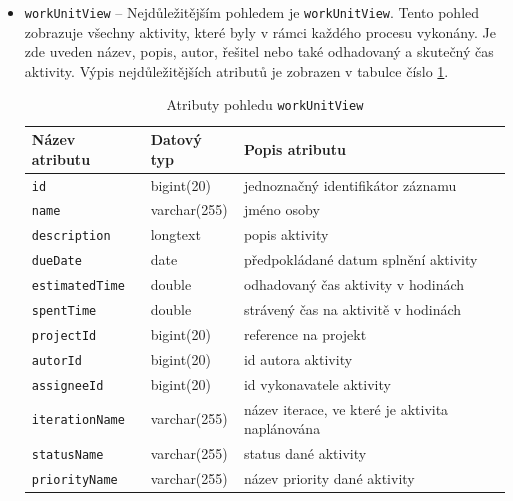 \documentclass[czech,DP]{thesiskiv}
\begin{document}
\begin{itemize}
    \item \texttt{workUnitView} -- Nejdůležitějším pohledem je \texttt{workUnitView}. Tento pohled zobrazuje všechny aktivity, které byly v rámci každého procesu vykonány. Je zde uveden název, popis, autor, řešitel nebo také odhadovaný a skutečný čas aktivity. Výpis nejdůležitějších atributů je zobrazen v tabulce číslo \ref{tab:workunitview}.
    \begin{table}[]
        \begin{tabular}{|l|l|l|}
        \hline
        \textbf{Název atributu} & \textbf{Datový typ} & \textbf{Popis atributu}                         \\ \hline \hline
        \texttt{id}             & bigint(20)          & jednoznačný identifikátor záznamu               \\ \hline
        \texttt{name}           & varchar(255)        & jméno osoby                                     \\ \hline
        \texttt{description}    & longtext        & popis aktivity                                  \\ \hline
        \texttt{dueDate}        & date                & předpokládané datum splnění aktivity            \\ \hline
        \texttt{estimatedTime}  & double              & odhadovaný čas aktivity v hodinách              \\ \hline
        \texttt{spentTime}      & double              & strávený čas na aktivitě v hodinách             \\ \hline
        \texttt{projectId}      & bigint(20)          & reference na projekt                            \\ \hline
        \texttt{autorId}        & bigint(20)         & id autora aktivity                              \\ \hline
        \texttt{assigneeId}     & bigint(20)         & id vykonavatele aktivity                        \\ \hline
        \texttt{iterationName}  & varchar(255)        & název iterace, ve které je aktivita naplánována \\ \hline
        \texttt{statusName}     & varchar(255)        & status dané aktivity                            \\ \hline
        \texttt{priorityName}   & varchar(255)        & název priority dané aktivity                    \\ \hline
        \end{tabular}
        \caption{\label{tab:workunitview}Atributy pohledu \texttt{workUnitView}}
    \end{table}


\end{itemize}
\end{document}
